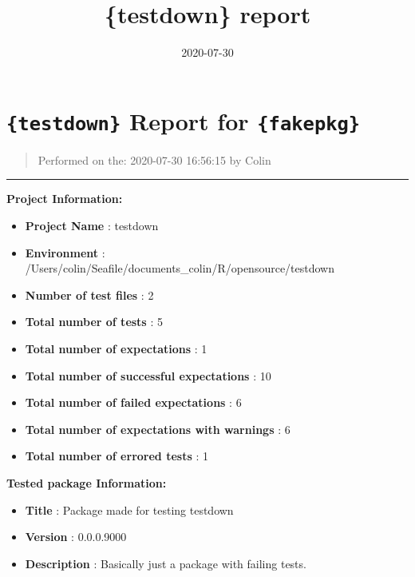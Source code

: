 \documentclass[
]{book}
\title{\{testdown\} report}
\author{}
\date{\vspace{-2.5em}2020-07-30}
\providecommand{\tightlist}{%
  \setlength{\itemsep}{0pt}\setlength{\parskip}{0pt}}
\begin{document}
\maketitle

{
\setcounter{tocdepth}{1}
\tableofcontents
}
\hypertarget{testdown-report-for-fakepkg}{%
\chapter*{\texorpdfstring{\texttt{\{testdown\}} Report for \texttt{\{fakepkg\}}}{\{testdown\} Report for \{fakepkg\}}}\label{testdown-report-for-fakepkg}}

\begin{quote}
Performed on the: 2020-07-30 16:56:15 by Colin
\end{quote}

\begin{center}\rule{0.5\linewidth}{0.5pt}\end{center}

\textbf{Project Information:}

\begin{itemize}
\tightlist
\item
  \textbf{Project Name} : testdown
\item
  \textbf{Environment} : /Users/colin/Seafile/documents\_colin/R/opensource/testdown
\item
  \textbf{Number of test files} : 2
\item
  \textbf{Total number of tests} : 5
\item
  \textbf{Total number of expectations} : 1
\item
  \textbf{Total number of successful expectations} : 10
\item
  \textbf{Total number of failed expectations} : 6
\item
  \textbf{Total number of expectations with warnings} : 6
\item
  \textbf{Total number of errored tests} : 1
\end{itemize}

\textbf{Tested package Information:}

\begin{itemize}
\tightlist
\item
  \textbf{Title} : Package made for testing testdown
\item
  \textbf{Version} : 0.0.0.9000
\item
  \textbf{Description} : Basically just a package with failing tests.
\end{itemize}
\end{document}
